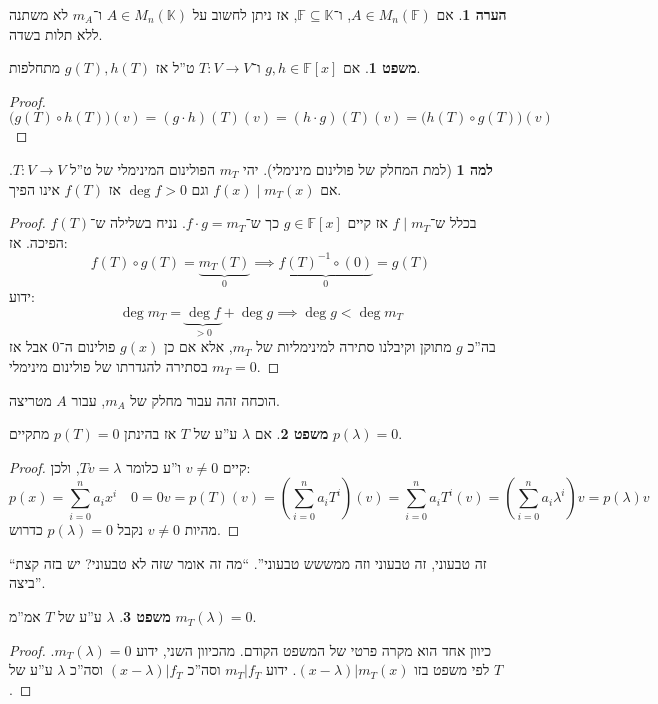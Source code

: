 \documentclass[a4paper]{article}
\newcommand\K     {\mathbb{K}}
\newcommand\F         {\mathbb{F}}
\newcommand\co        {\colon}
\renewcommand\lg      {\lambda}
\newcommand\op    {^{-1}}
\newcommand\cl [1]    {\left ( #1 \right )}
\theoremstyle{definition}
\newtheorem{Theorem}{\color{myblue}משפט}
\newtheorem{Lemma}{\color{myyellow}למה}
\newtheorem{Remark}{\color{mycyan}הערה}
\newcommand\theo  [1] {\begin{Theorem}#1\end{Theorem}}
\newcommand\rmark [1] {\begin{Remark}#1\end{Remark}}
\begin{document}
	\rmark{אם $A \in M_n(\F)$, ו־$\F \subseteq \K$, אז ניתן לחשוב על $A \in M_n(\K)$ ו־$m_A$ לא משתנה ללא תלות בשדה. }
	\theo{אם $g, h \in \F[x]$ ו־$T \co V \to V$ ט''ל אז $g(T), h(T)$ מתחלפות. }
	\begin{proof}
		\[ \big(g(T) \circ h(T)\big)(v) = (g \cdot h)(T)(v) = (h \cdot g)(T)(v) = \big(h(T) \circ g(T) \big)(v) \]
	\end{proof}
	
	\begin{Lemma}[למת המחלק של פולינום מינימלי]
		יהי $m_T$ הפולינום המינימלי של ט''ל $T \co V \to V$. אם $f(x) \mid m_T(x)$ וגם $\deg f > 0$ אז $f(T)$ אינו הפיך. 
	\end{Lemma}
	\begin{proof}
		בכלל ש־$f \mid m_T$ אז קיים $g\in \F[x]$ כך ש־$f \cdot g = m_T$. נניח בשלילה ש־$f(T)$ הפיכה. אז: 
		\[ f(T) \circ g(T) = \underbrace{m_T(T)}_{0} \implies \underbrace{f(T)\op \circ (0)}_{0} = g(T) \]
		ידוע: 
		\[ \deg m_T = \underbrace{\deg f}_{>0} + \deg g \implies \deg g< \deg m_T \]
		בה''כ $g$ מתוקן וקיבלנו סתירה למינימליות של $m_T$, אלא אם כן $g(x)$ פולינום ה־$0$ אבל אז $m_T = 0$ בסתירה להגדרתו של פולינום מינימלי. 
	\end{proof}
	הוכחה זהה עבור מחלק של $m_A$, עבור $A$ מטריצה. 
	\theo{אם $\lg$ ע''ע של $T$ אז בהינתן $p(T) = 0$ מתקיים $p(\lg) = 0$. }\begin{proof}
		קיים $v \neq 0$ ו''ע כלומר $Tv = \lg$, ולכן: 
		\[ p(x) = \sum_{i = 0}^{n}a_ix^i \quad 0 = 0 v = p(T)(v) = \cl{\sum_{i = 0}^{n}a_iT^{i}}\cl{v} = \sum_{i = 0}^{n}a_iT^{i}(v) = \cl{\sum_{i = 0}^{n}a_i\lg^i}v = p(\lg)v \] 
		מהיות $v \neq 0$ נקבל $p(\lg) = 0$ כדרוש. 
	\end{proof}
	``זה טבעוני, זה טבעוני וזה ממששש טבעוני''. ``מה זה אומר שזה לא טבעוני? יש בזה קצת ביצה''. 
	\theo{$\lg$ ע''ע של $T$ אמ''מ $m_T(\lg) = 0$. } \begin{proof}
		כיוון אחד הוא מקרה פרטי של המשפט הקודם. מהכיוון השני, ידוע $m_T(\lg) = 0$. לפי משפט בזו $(x - \lg) | m_T(x)$. ידוע $m_T | f_T$ וסה''כ $(x - \lg) | f_T$ וסה''כ $\lg$ ע''ע של $T$. 
	\end{proof}
	
\end{document}
